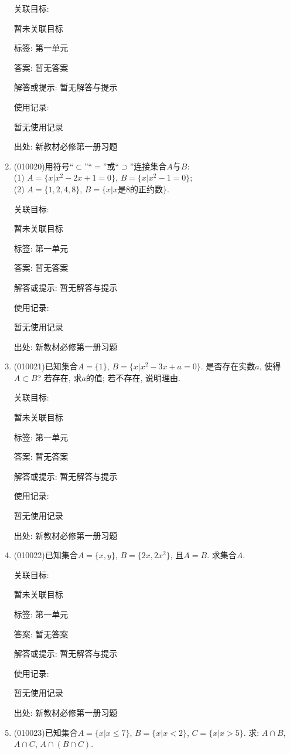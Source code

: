 \documentclass[10pt,a4paper]{article}
\begin{document}
\begin{enumerate}[1.]
关联目标:

暂未关联目标



标签: 第一单元

答案: 暂无答案

解答或提示: 暂无解答与提示

使用记录:

暂无使用记录


出处: 新教材必修第一册习题
\item { (010020)}用符号``$\subset$''``$=$''或``$\supset$''连接集合$A$与$B$:\\
(1) $A=\{x|x^2-2x+1=0\}$, $B=\{x|x^2-1=0\}$;\\
(2) $A=\{1, 2, 4, 8\}$, $B=\{x|x$是$8$的正约数$\}$.


关联目标:

暂未关联目标



标签: 第一单元

答案: 暂无答案

解答或提示: 暂无解答与提示

使用记录:

暂无使用记录


出处: 新教材必修第一册习题
\item { (010021)}已知集合$A=\{1\}$, $B=\{x|x^2-3x+a=0\}$. 是否存在实数$a$, 使得$A\subset B$?  若存在, 求$a$的值; 若不存在, 说明理由.


关联目标:

暂未关联目标



标签: 第一单元

答案: 暂无答案

解答或提示: 暂无解答与提示

使用记录:

暂无使用记录


出处: 新教材必修第一册习题
\item { (010022)}已知集合$A=\{x, y\}$, $B=\{2x, 2x^2\}$, 且$A=B$. 求集合$A$.


关联目标:

暂未关联目标



标签: 第一单元

答案: 暂无答案

解答或提示: 暂无解答与提示

使用记录:

暂无使用记录


出处: 新教材必修第一册习题
\item { (010023)}已知集合$A=\{x|x\le 7\}$, $B=\{x|x<2\}$, $C=\{x|x>5\}$. 求: $A\cap B$, $A\cap C$, $A\cap (B\cap C)$.



\end{enumerate}
\end{document}
